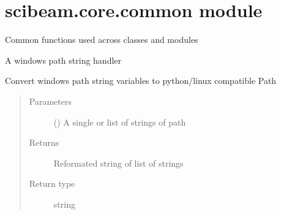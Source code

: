 \documentclass[letterpaper,10pt,english]{sphinxmanual}
\begin{document}
\begin{fulllineitems}

\begin{fulllineitems}
\label{\detokenize{scibeam.core:scibeam.core.base.Defaults.subfolder_regex}}
\end{fulllineitems}


\end{fulllineitems}



\section{scibeam.core.common module}
\label{\detokenize{scibeam.core:module-scibeam.core.common}}\label{\detokenize{scibeam.core:scibeam-core-common-module}}
Common functions used across classes and modules

\begin{fulllineitems}
\label{\detokenize{scibeam.core:scibeam.core.common.winPathHandler}}
A windows path string handler

Convert windows path string variables to python/linux compatible Path
\begin{quote}\begin{description}
\item[{Parameters}] \leavevmode
{} () \textendash{} A single or list of strings of path

\item[{Returns}] \leavevmode
Reformated string of list of strings

\item[{Return type}] \leavevmode
string

\end{description}\end{quote}

\end{fulllineitems}

\end{document}
